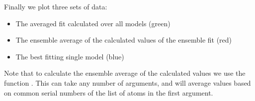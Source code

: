 \documentclass[a4paper,10pt,english,openany,oneside]{sphinxmanual}
\begin{document}
\sphinxAtStartPar
Finally we plot three sets of data:
\begin{itemize}
\item {} 
\sphinxAtStartPar
The averaged fit calculated over all models (green)

\item {} 
\sphinxAtStartPar
The ensemble average of the calculated values of the ensemble fit (red)

\item {} 
\sphinxAtStartPar
The best fitting single model (blue)

\end{itemize}

\sphinxAtStartPar
Note that to calculate the ensemble average of the calculated values we use the function {\hyperref[\detokenize{reference/generated/paramagpy.fit.ensemble_average:paramagpy.fit.ensemble_average}]{}}. This can take any number of arguments, and will average values based on common serial numbers of the list of atoms in the first argument.
\end{document}
